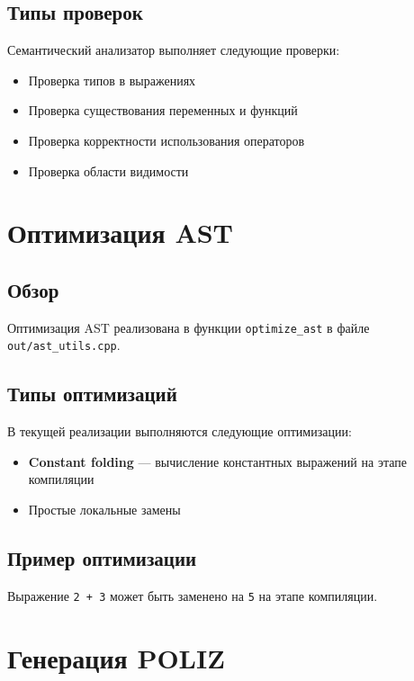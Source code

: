 \documentclass[12pt,a4paper]{article}
\begin{document}
\subsection{Типы проверок}

Семантический анализатор выполняет следующие проверки:

\begin{itemize}
    \item Проверка типов в выражениях
    \item Проверка существования переменных и функций
    \item Проверка корректности использования операторов
    \item Проверка области видимости
\end{itemize}

\section{Оптимизация AST}

\subsection{Обзор}

Оптимизация AST реализована в функции \texttt{optimize\_ast} в файле \texttt{out/ast\_utils.cpp}.

\subsection{Типы оптимизаций}

В текущей реализации выполняются следующие оптимизации:

\begin{itemize}
    \item \textbf{Constant folding} --- вычисление константных выражений на этапе компиляции
    \item Простые локальные замены
\end{itemize}

\subsection{Пример оптимизации}

Выражение \texttt{2 + 3} может быть заменено на \texttt{5} на этапе компиляции.

\section{Генерация POLIZ}
\end{document}
